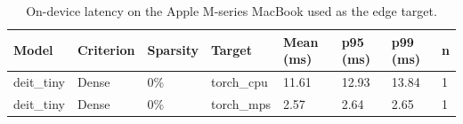 \begin{table}[t]
\centering
\small
\begin{tabular}{llllllll}
\toprule
Model & Criterion & Sparsity & Target & Mean (ms) & p95 (ms) & p99 (ms) & n \\
\midrule
deit\_tiny & Dense & 0\% & torch\_cpu & 11.61 & 12.93 & 13.84 & 1 \\
deit\_tiny & Dense & 0\% & torch\_mps & 2.57 & 2.64 & 2.65 & 1 \\
\bottomrule
\end{tabular}
\caption{On-device latency on the Apple M-series MacBook used as the edge target.}
\label{tab:edge_latency}
\end{table}
